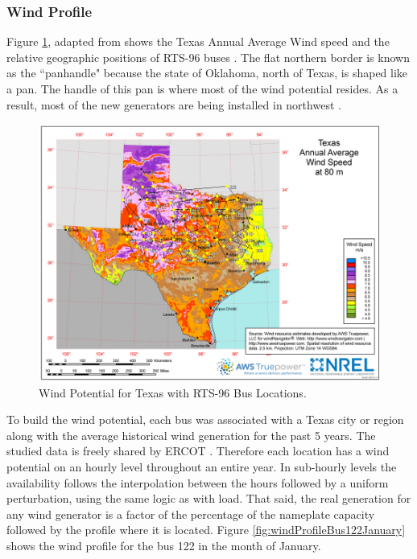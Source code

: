 \documentclass[12pt,LUDisStyle,twosided]{book}
\begin{document}
\newpage
\subsubsection{Wind Profile}


Figure \ref{fig:texasWindProfile}, adapted from \cite{texasWindProfile} shows the Texas Annual Average Wind speed and the relative geographic positions of RTS-96 buses \cite{wongieee}. The flat northern border is known as the ``panhandle" because the state of Oklahoma, north of Texas, is shaped like a pan. The handle of this pan is where most of the wind potential resides. As a result, most of the new generators are being installed in northwest \cite{texasWindProfile}.

\begin{figure}[H] 
  \includegraphics[width=\textwidth,keepaspectratio]{texasWindProfileWithBuses.png}
  \caption{Wind Potential for Texas with RTS-96 Bus Locations.}
  \label{fig:texasWindProfile}
\end{figure}


To build the wind potential, each bus was associated with a Texas city or region along with the average historical wind generation for the past 5 years. The studied data is freely shared by ERCOT \cite{ercotGenerationWind}. Therefore each location has a wind potential on an hourly level throughout an entire year. In sub-hourly levels the availability follows the interpolation between the hours followed by a uniform perturbation, using the same logic as with load. That said, the real generation for any wind generator is a factor of the percentage of the nameplate capacity followed by the profile where it is located. Figure \ref{fig:windProfileBus122January} shows the wind profile for the bus 122 in the month of January.
\end{document}
